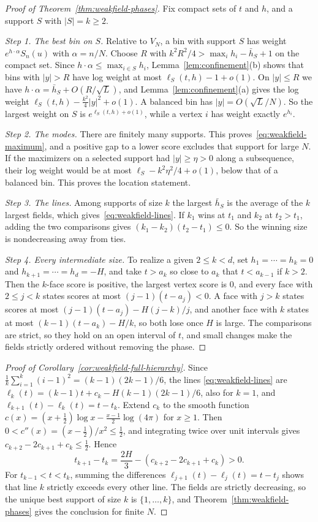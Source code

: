 \begin{proof}[Proof of Theorem~\ref{thm:weakfield-phases}]
Fix compact sets of $t$ and $h$, and a support $S$ with $|S|=k\ge2$.

\emph{Step 1. The best bin on $S$.} Relative to $V_N$, a bin with support $S$
has weight $e^{h\cdot\alpha}S_n(u)$ with $\alpha=n/N$. Choose $R$ with
$k^2R^2/4>\max_ih_i-\bar h_S+1$ on the compact set. Since
$h\cdot\alpha\le\max_{i\in S}h_i$, Lemma~\ref{lem:confinement}(b) shows that
bins with $|y|>R$ have log weight at most $\ell_S(t,h)-1+o(1)$. On $|y|\le R$ we
have $h\cdot\alpha=\bar h_S+O(R/\sqrt L)$, and Lemma~\ref{lem:confinement}(a)
gives the log weight $\ell_S(t,h)-\frac{k^2}4|y|^2+o(1)$. A balanced bin has
$|y|=O(\sqrt L/N)$. So the largest weight on $S$ is $e^{\ell_S(t,h)+o(1)}$,
while a vertex $i$ has weight exactly $e^{h_i}$.

\emph{Step 2. The modes.} There are finitely many supports. This
proves~\eqref{eq:weakfield-maximum}, and a positive gap to a lower score excludes
that support for large $N$. If the maximizers on a selected support had
$|y|\ge\eta>0$ along a subsequence, their log weight would be at most
$\ell_S-k^2\eta^2/4+o(1)$, below that of a balanced bin. This proves the
location statement.

\emph{Step 3. The lines.} Among supports of size $k$ the largest $\bar h_S$ is
the average of the $k$ largest fields, which gives~\eqref{eq:weakfield-lines}. If
$k_1$ wins at $t_1$ and $k_2$ at $t_2>t_1$, adding the two comparisons gives
$(k_1-k_2)(t_2-t_1)\le0$. So the winning size is nondecreasing away from ties.

\emph{Step 4. Every intermediate size.} To realize a given $2\le k<d$, set
$h_1=\cdots=h_k=0$ and $h_{k+1}=\cdots=h_d=-H$, and take $t>a_k$ so close to
$a_k$ that $t<a_{k-1}$ if $k>2$. Then the $k$-face score is positive, the
largest vertex score is $0$, and every face with $2\le j<k$ states scores at
most $(j-1)(t-a_j)<0$. A face with $j>k$ states scores at most
$(j-1)(t-a_j)-H(j-k)/j$, and another face with $k$ states at most
$(k-1)(t-a_k)-H/k$, so both lose once $H$ is large. The comparisons are strict,
so they hold on an open interval of $t$, and small changes make the fields
strictly ordered without removing the phase.
\end{proof}

\begin{proof}[Proof of Corollary~\ref{cor:weakfield-full-hierarchy}]
Since $\frac1k\sum_{i=1}^k(i-1)^2=(k-1)(2k-1)/6$, the lines
\eqref{eq:weakfield-lines} are $\ell_k(t)=(k-1)t+c_k-H(k-1)(2k-1)/6$, also for
$k=1$, and $\ell_{k+1}(t)-\ell_k(t)=t-t_k$. Extend $c_k$ to the smooth function
$c(x)=(x+\frac12)\log x-\frac{x-1}2\log(4\pi)$ for $x\ge1$. Then
$0<c''(x)=(x-\frac12)/x^2\le\frac12$, and integrating twice over unit intervals
gives $c_{k+2}-2c_{k+1}+c_k\le\frac12$. Hence
\[
 t_{k+1}-t_k=\frac{2H}{3}-(c_{k+2}-2c_{k+1}+c_k)>0.
\]
For $t_{k-1}<t<t_k$, summing the differences $\ell_{j+1}(t)-\ell_j(t)=t-t_j$
shows that line $k$ strictly exceeds every other line. The fields are strictly
decreasing, so the unique best support of size $k$ is $\{1,\ldots,k\}$, and
Theorem~\ref{thm:weakfield-phases} gives the conclusion for finite $N$.
\end{proof}
